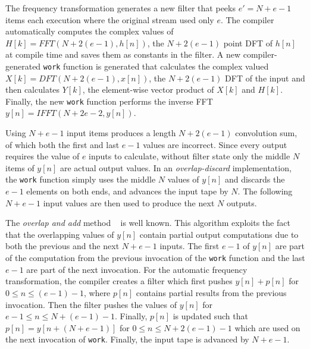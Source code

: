 The frequency transformation generates a new filter that
peeks $e'=N+e-1$ items each execution where the original stream used only $e$.
The compiler automatically computes the complex values of
$H[k]=FFT(N+2(e-1),h[n])$, the $N+2(e-1)$ point DFT of $h[n]$ at compile
time and saves them as constants in the filter.
A new compiler-generated {\tt work} function is generated that calculates the complex 
valued $X[k]=DFT(N+2(e-1),x[n])$, the $N+2(e-1)$ DFT of the input and 
then calculates $Y[k]$, the element-wise vector product 
of $X[k]$ and $H[k]$. Finally, the new {\tt work} function performs
the inverse FFT $y[n]=IFFT(N+2e-2,y[n])$.

Using $N+e-1$ input items produces a length $N+2(e-1)$ convolution sum, 
of which both the first and last $e-1$ values are incorrect. Since every output requires 
the value of $e$ inputs to calculate, without filter state 
only the middle $N$ items of $y[n]$ are actual output values. 
In an {\it overlap-discard} implementation, the {\tt work} function simply
uses the middle $N$ values of $y[n]$ and discards the 
$e-1$ elements on both ends, and advances the input tape by $N$.
The following $N+e-1$ input values are then used to produce the next $N$ outputs.

The {\it overlap and add} method ~\cite{oppenheim-discrete} is well known.
This algorithm exploits the fact that the overlapping values of $y[n]$ contain partial
output computations due to both the previous and the next $N+e-1$ inputs.
The first $e-1$ of $y[n]$ are part of the computation from the previous invocation of the 
{\tt work} function and the last $e-1$ are part of the next invocation. 
For the automatic frequency transformation, the compiler creates a filter which first pushes 
$y[n]+p[n]$ for $0 \le n \le (e-1)-1$, where $p[n]$ contains partial results from the 
previous invocation. Then the filter pushes the values of $y[n]$ for $e-1 \le n \le N+(e-1)-1$.
Finally, $p[n]$ is updated such that $p[n]=y[n+(N+e-1)]$ for 
$0 \le n \le N+2(e-1)-1$ which are used on the next invocation of {\tt work}.
Finally, the input tape is advanced by $N+e-1$.

